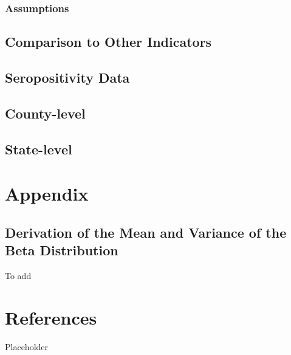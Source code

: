 \documentclass[12pt,twoside]{smiththesis}
\begin{document}
\hypertarget{assumptions}{%
\subsection{Assumptions}\label{assumptions}}

\hypertarget{comparison-to-other-indicators}{%
\section{Comparison to Other Indicators}\label{comparison-to-other-indicators}}

\hypertarget{seropositivity-data}{%
\section{Seropositivity Data}\label{seropositivity-data}}

\hypertarget{county-level-1}{%
\section{County-level}\label{county-level-1}}

\hypertarget{state-level-1}{%
\section{State-level}\label{state-level-1}}

\appendix

\hypertarget{appendix}{%
\chapter{Appendix}\label{appendix}}

\hypertarget{derivation-of-the-mean-and-variance-of-the-beta-distribution}{%
\section{Derivation of the Mean and Variance of the Beta Distribution}\label{derivation-of-the-mean-and-variance-of-the-beta-distribution}}

To add

\hypertarget{references}{%
\chapter*{References}\label{references}}

Placeholder
\end{document}
